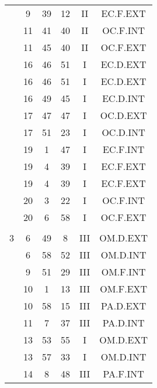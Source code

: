 \documentclass[12pt, a4paper]{article}
\begin{document}
\begin{multicols}{3}
{\begin{tabular}{c c c c c c}
	 	 	 	 & 9 & 39 & 12 & II & EC.F.EXT\\%
	 	 	 	 & 11 & 41 & 40 & II & OC.F.INT\\%
	 	 	 	 & 11 & 45 & 40 & II & OC.F.EXT\\%
	 	 	 	 & 16 & 46 & 51 & I & EC.D.EXT\\%
	 	 	 	 & 16 & 46 & 51 & I & EC.D.EXT\\%
	 	 	 	 & 16 & 49 & 45 & I & EC.D.INT\\%
	 	 	 	 & 17 & 47 & 47 & I & OC.D.EXT\\%
	 	 	 	 & 17 & 51 & 23 & I & OC.D.INT\\%
	 	 	 	 & 19 & 1 & 47 & I & EC.F.INT\\%
	 	 	 	 & 19 & 4 & 39 & I & EC.F.EXT\\%
	 	 	 	 & 19 & 4 & 39 & I & EC.F.EXT\\%
	 	 	 	 & 20 & 3 & 22 & I & OC.F.INT\\%
	 	 	 	 & 20 & 6 & 58 & I & OC.F.EXT\\%
	 	 	 	 & & & & & \\%
	 	 	 	3 & 6 & 49 & 8 & III & OM.D.EXT\\%
	 	 	 	 & 6 & 58 & 52 & III & OM.D.INT\\%
	 	 	 	 & 9 & 51 & 29 & III & OM.F.INT\\%
	 	 	 	 & 10 & 1 & 13 & III & OM.F.EXT\\%
	 	 	 	 & 10 & 58 & 15 & III & PA.D.EXT\\%
	 	 	 	 & 11 & 7 & 37 & III & PA.D.INT\\%
	 	 	 	 & 13 & 53 & 55 & I & OM.D.EXT\\%
	 	 	 	 & 13 & 57 & 33 & I & OM.D.INT\\%
	 	 	 	 & 14 & 8 & 48 & III & PA.F.INT\\%

\end{tabular}}
\end{multicols}
\end{document}
